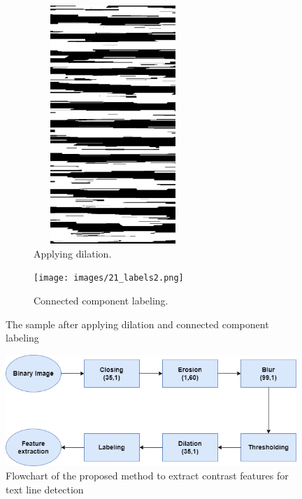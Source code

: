 \begin{itemize}
        \begin{figure}[!htb]
             \centering
             \begin{subfigure}[b]{0.4\textwidth}
                \centering
                \includegraphics[width=6cm, height=9cm]{images/dilation.png}
                \caption{Applying dilation. }
                \label{fig:Dilation_img}
             \end{subfigure}
             \hfill
             \begin{subfigure}[b]{0.4\textwidth}
                \centering
                \texttt{[image: images/21\_labels2.png]}
                \caption{Connected component labeling.}
                \label{fig:Labeling_img}
             \end{subfigure}
            \caption{The sample after applying dilation and connected component labeling}
            \label{fig:dialation-and-ccl}
        \end{figure}
        

\end{itemize}

\begin{figure}[!htb]
    \centering
    \includegraphics[width=11cm]{images/Flowchart_MO.png}
    \caption{Flowchart of the proposed method to extract contrast features for text line detection}
    \label{fig:Flowchart_MO}
\end{figure} 


